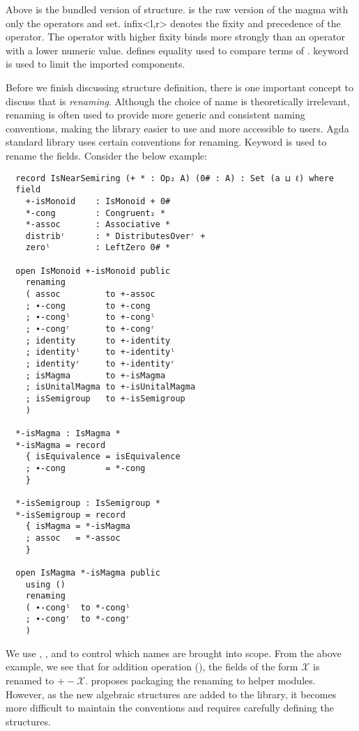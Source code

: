 Above is the bundled version of  structure.  is
the raw version of the magma with only the operators and set. infix<l,r> denotes
the fixity and precedence of the operator. The operator with higher fixity binds
more strongly than an operator with a lower numeric value.  defines
equality used to compare terms of .  keyword is used
to limit the imported components. 

Before we finish discussing structure definition, there is one important concept
to discuss that is \emph{renaming}. Although the choice of name is theoretically
irrelevant, renaming is often used to provide more generic and consistent naming
conventions, making the library easier to use and more accessible to users. Agda
standard library uses certain conventions for renaming. Keyword
 is used to rename the fields. Consider the below example:

\label{code:rename}
\begin{verbatim}
  record IsNearSemiring (+ * : Op₂ A) (0# : A) : Set (a ⊔ ℓ) where
  field
    +-isMonoid    : IsMonoid + 0#
    *-cong        : Congruent₂ *
    *-assoc       : Associative *
    distribʳ      : * DistributesOverʳ +
    zeroˡ         : LeftZero 0# *

  open IsMonoid +-isMonoid public
    renaming
    ( assoc         to +-assoc
    ; ∙-cong        to +-cong
    ; ∙-congˡ       to +-congˡ
    ; ∙-congʳ       to +-congʳ
    ; identity      to +-identity
    ; identityˡ     to +-identityˡ
    ; identityʳ     to +-identityʳ
    ; isMagma       to +-isMagma
    ; isUnitalMagma to +-isUnitalMagma
    ; isSemigroup   to +-isSemigroup
    )

  *-isMagma : IsMagma *
  *-isMagma = record
    { isEquivalence = isEquivalence
    ; ∙-cong        = *-cong
    }

  *-isSemigroup : IsSemigroup *
  *-isSemigroup = record
    { isMagma = *-isMagma
    ; assoc   = *-assoc
    }

  open IsMagma *-isMagma public
    using ()
    renaming
    ( ∙-congˡ  to *-congˡ
    ; ∙-congʳ  to *-congʳ
    )
\end{verbatim} 
We use , , and  to control which
names are brought into scope. From the above example, we see that for addition
operation (\inline{+}), the fields of the form $\mathscr{X}$ is renamed to
$+-\mathscr{X}$. \cite{musa} proposes packaging the renaming to helper modules.
However, as the new algebraic structures are added to the library, it becomes
more difficult to maintain the conventions and requires carefully defining the
structures.  

